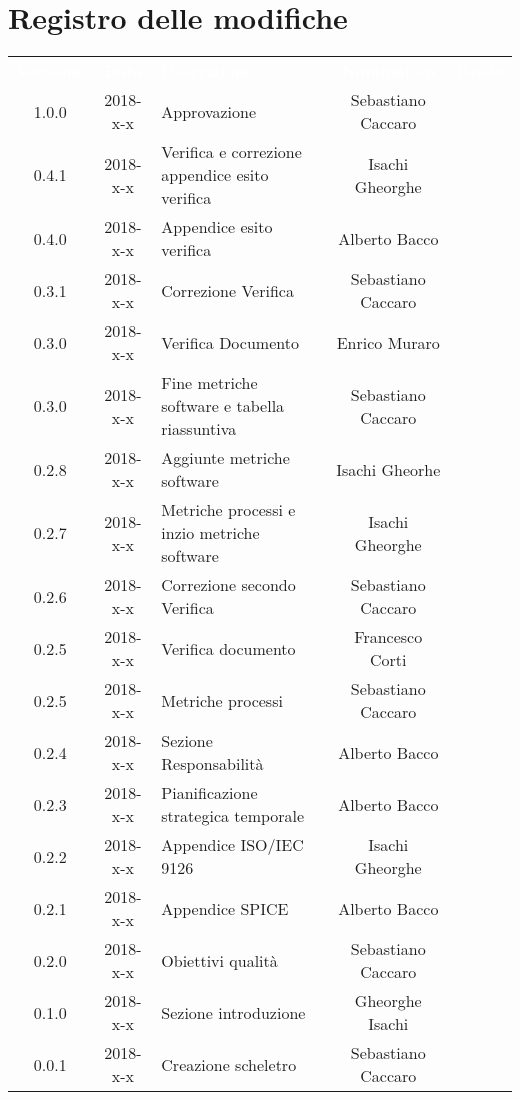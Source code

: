 
\section*{Registro delle modifiche}
{
	\renewcommand{\arraystretch}{1}
	\centering
	\begin{longtable}{c c C{4cm} c  c }
		\textcolor{white}{\textbf{Versione}} &
		\textcolor{white}{\textbf{Data}} &
		\textcolor{white}{\textbf{Descrizione}} &
		\textcolor{white}{\textbf{Nominativo}} &
		\textcolor{white}{\textbf{Ruolo}}
		\\
		1.0.0 &
		2018-x-x &
		Approvazione &
		Sebastiano Caccaro &
		\Res{}
		\\
		0.4.1 &
		2018-x-x &
		Verifica e correzione appendice esito verifica &
		Isachi Gheorghe &
		\ver{}
		\\
		0.4.0 &
		2018-x-x &
		Appendice esito verifica &
		Alberto Bacco &
		\ver{}
		\\
		0.3.1 &
		2018-x-x &
		Correzione Verifica &
		Sebastiano Caccaro &
		\ana{}
		\\
		0.3.0 &
		2018-x-x &
		Verifica Documento &
		Enrico Muraro &
		\ver{}
		\\
		0.3.0 &
		2018-x-x &
		Fine metriche software e tabella riassuntiva &
		Sebastiano Caccaro &
		\ana{}
		\\
		0.2.8 &
		2018-x-x &
		Aggiunte metriche software  &
		Isachi Gheorhe &
		\ana{}
		\\
		0.2.7 &
		2018-x-x &
		Metriche processi e inzio metriche software &
		Isachi Gheorghe &
		\ana{}
		\\
		0.2.6 &
		2018-x-x &
		Correzione secondo Verifica &
		Sebastiano Caccaro &
		\ana{}
		\\
		0.2.5 &
		2018-x-x &
		Verifica documento &
		Francesco Corti &
		\ver{}
		\\
		0.2.5 &
		2018-x-x &
		Metriche processi &
		Sebastiano Caccaro &
		\ana{}
		\\
		0.2.4 &
		2018-x-x &
		Sezione Responsabilità &
		Alberto Bacco &
		\ana{}
		\\
		0.2.3 &
		2018-x-x &
		Pianificazione strategica temporale &
		Alberto Bacco &
		\ana{}
		\\
		0.2.2 &
		2018-x-x &
		Appendice ISO/IEC 9126 &
		Isachi Gheorghe &
		\ana{}
		\\
		0.2.1 &
		2018-x-x &
		Appendice SPICE &
		Alberto Bacco &
		\ana{}
		\\
		0.2.0 &
		2018-x-x &
		Obiettivi qualità &
		Sebastiano Caccaro &
		\ana{}
		\\
		0.1.0 &
		2018-x-x &
		Sezione introduzione &
		Gheorghe Isachi&
		\ana{}
		\\
		0.0.1 &
		2018-x-x &
		Creazione scheletro &
		Sebastiano Caccaro&
		\ana{}
		\\
	\end{longtable}

}
